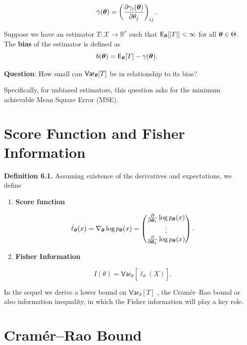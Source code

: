 \[\dot{\gamma}(\boldsymbol{\theta}) = \left(\frac{\partial \gamma_i(\boldsymbol{\theta})}{\partial \theta_j}\right)_{ij}.\]

\begin{definition}[Bias]
    Suppose we have an estimator \(T: \mathcal{X} \to \mathbb{R}^r\) such that \(\mathsf{E}_{\boldsymbol{\theta}}[|T|] < \infty\) for all \(\boldsymbol{\theta} \in \Theta\). The \textbf{bias} of the estimator is defined as
    \[
        b(\boldsymbol{\theta}) = \mathsf{E}_{\boldsymbol{\theta}}[T] - \gamma(\boldsymbol{\theta}).
    \]
\end{definition}

\textbf{Question}: How small can \(\mathsf{Var}_{\boldsymbol{\theta}}[T]\) be in relationship to its bias? 

Specifically, for unbiased estimators, this question asks for the minimum achievable Mean Square Error (MSE).

\section{Score Function and Fisher
		Information}

\textbf{Definition 6.1.} Assuming existence of the derivatives and
expectations, we define

\begin{enumerate}[label=\roman*.]
	\item \textbf{Score function}

\[\dot{\ell}_{\boldsymbol{\theta}}(x) = \nabla_{\boldsymbol{\theta}} \log p_{\boldsymbol{\theta}}(x) = \begin{pmatrix} \frac{\partial}{\partial \boldsymbol{\theta}_{1}} \log p_{\boldsymbol{\theta}}(x) \\ \vdots \\ \frac{\partial}{\partial \boldsymbol{\theta}_{k}} \log p_{\boldsymbol{\theta}}(x) \end{pmatrix}.\]

    \item \textbf{Fisher Information} 

\[I(\theta) = \mathsf{Var}_{\theta}[\dot{\ell}_{\theta}(X)].\]
\end{enumerate}

In the sequel we derive a lower bound on \(\mathsf{Var}_{\theta}[T]\) , the
Cram\'er--Rao bound or also information inequality, in which the Fisher
information will play a key role.

\section{Cram\'er--Rao Bound}

